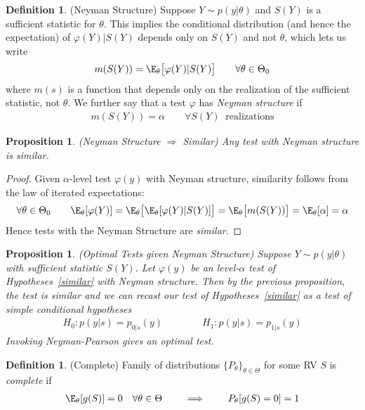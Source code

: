 \documentclass[12pt]{article}
\theoremstyle{plain}
\newtheorem{prop}[thm]{Proposition}
\theoremstyle{definition}
\newtheorem{defn}[thm]{Definition}
\theoremstyle{remark}
\begin{document}
\begin{defn}(Neyman Structure)
Suppose $Y\sim p(y|\theta)$ and $S(Y)$ is a sufficient statistic for
$\theta$. This implies the conditional distribution (and hence the
expectation) of $\varphi(Y)|S(Y)$ depends only on $S(Y)$ and not
$\theta$,  which lets us write
\begin{align*}
  m(S(Y))
  =
  \E_{\theta}\big[\varphi(Y)|S(Y)\big]
  \qquad
  \forall \theta\in\Theta_0
\end{align*}
where $m(s)$ is a function that depends only on the realization of the
sufficient statistic, not $\theta$.
We further say that a test $\varphi$ has \emph{Neyman structure} if
\begin{align*}
  m(S(Y))=\alpha
  \qquad
  \forall S(Y)
  \;\;\text{realizations}
\end{align*}
\end{defn}

\begin{prop}\emph{(Neyman Structure $\Rightarrow$ Similar)}
Any test with Neyman structure is similar.
\end{prop}
\begin{proof}
Given $\alpha$-level test $\varphi(y)$ with Neyman structure, similarity
follows from the law of iterated expectations:
\begin{align*}
  \forall\theta\in\Theta_0
  \qquad
  \E_{\theta}[\varphi(Y)]
  =
  \E_{\theta}\big[
    \E_{\theta}[
    \varphi(Y)|S(Y)
    ]
  \big]
  =
  \E_{\theta}\big[
    m(S(Y))
  \big]
  =
  \E_{\theta}[\alpha]
  =\alpha
\end{align*}
Hence tests with the Neyman Structure are \emph{similar}.
\end{proof}


\begin{prop}\emph{(Optimal Tests given Neyman Structure)}
Suppose $Y\sim p(y|\theta)$ with sufficient statistic $S(Y)$.
Let $\varphi(y)$ be an level-$\alpha$ test of Hypotheses~\ref{similar}
with Neyman structure.
Then by the previous proposition, the test is similar and we can recast
our test of Hypotheses~\ref{similar} as a test of simple conditional
hypotheses
\begin{align*}
  H_0: p(y|s) = p_{0|s}(y)
  \qquad \qquad
  H_1: p(y|s)= p_{1|s}(y)
\end{align*}
Invoking Neyman-Pearson gives an optimal test.
\end{prop}

\begin{defn}(Complete)
Family of distributions $\{P_\theta\}_{\theta\in\Theta}$ for some RV
$S$ is \emph{complete} if
\begin{align*}
  \E_\theta[g(S)]=0
  \quad\forall \theta\in\Theta
  \qquad \implies\qquad
  P_\theta[g(S)=0]=1
\end{align*}
\end{defn}
\end{document}
